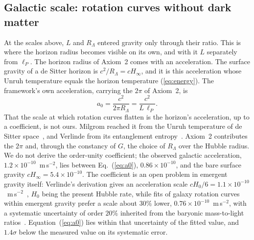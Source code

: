 \documentclass[aps,prd,twocolumn,superscriptaddress,nofootinbib,showkeys]{revtex4-2}
\begin{document}
\subsection{Galactic scale: rotation curves without dark matter}\label{sec:galactic}

At the scales above, $L$ and $R_\Lambda$ entered gravity only through their ratio. This is where the horizon radius becomes visible on its own, and with it $L$ separately from $\ell_P$. The horizon radius of Axiom~2 comes with an acceleration. The surface gravity of a de Sitter horizon is $c^2/R_\Lambda = cH_\infty$, and it is this acceleration whose Unruh temperature equals the horizon temperature (\ref{eq:energy}). The framework's own acceleration, carrying the $2\pi$ of Axiom~2, is
\begin{equation}
a_0 = \frac{c^2}{2\pi R_\Lambda} = \frac{c^2}{L\,\ell_P} .
\label{eq:a0}
\end{equation}
That the scale at which rotation curves flatten is the horizon's acceleration, up to a coefficient, is not ours. Milgrom reached it from the Unruh temperature of de Sitter space~\cite{milgrom1999}, and Verlinde from its entanglement entropy~\cite{verlinde2017}. Axiom~2 contributes the $2\pi$ and, through the constancy of $G$, the choice of $R_\Lambda$ over the Hubble radius. We do not derive the order-unity coefficient; the observed galactic acceleration, $1.2\times10^{-10}$~m\,s$^{-2}$, lies between Eq.~(\ref{eq:a0}), $0.86\times10^{-10}$, and the bare surface gravity $cH_\infty = 5.4\times10^{-10}$. The coefficient is an open problem in emergent gravity itself: Verlinde's derivation gives an acceleration scale $cH_0/6 = 1.1\times10^{-10}$~m\,s$^{-2}$~\cite{verlinde2017}, $H_0$ being the present Hubble rate, while fits of galaxy rotation curves within emergent gravity prefer a scale about $30\%$ lower, $0.76\times10^{-10}$~m\,s$^{-2}$, with a systematic uncertainty of order $20\%$ inherited from the baryonic mass-to-light ratios~\cite{yoon2025,yoon2023}. Equation~(\ref{eq:a0}) lies within that uncertainty of the fitted value, and $1.4\sigma$ below the measured value on its systematic error.
\end{document}
